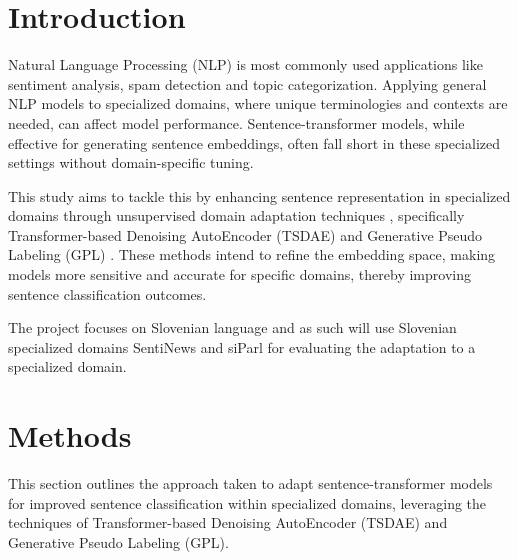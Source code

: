 \documentclass[fleqn,moreauthors,10pt]{ds_report}
\affiliation{\textit{Advisors: Boshko Koloski}}
\begin{document}
\flushbottom 

\maketitle 

\thispagestyle{empty} 


\section*{Introduction}

Natural Language Processing (NLP) is most commonly used applications like sentiment analysis, spam detection and topic categorization. 
Applying general NLP models to specialized domains, where unique terminologies and contexts are needed, can affect model performance. 
Sentence-transformer models, while effective for generating sentence embeddings, often fall short in these specialized settings without domain-specific tuning.

This study aims to tackle this by enhancing sentence representation in specialized domains through unsupervised domain adaptation techniques \cite{unsupervised-domain-adaptation, transfer-leraning-domain-adaptation, knowlage-distillation}, specifically Transformer-based Denoising AutoEncoder (TSDAE) \cite{tsdae} and Generative Pse\-udo Labeling (GPL) \cite{gpl}. 
These methods intend to refine the embedding space, making models more sensitive and accurate for specific domains, thereby improving sentence classification outcomes.

The project focuses on Slovenian language and as such will use Slovenian specialized domains SentiNews \cite{SentiNews} and siParl \cite{siParl} for evaluating the adaptation to a specialized domain.



\section*{Methods}

This section outlines the approach taken to adapt sentence-transformer models for improved sentence classification within specialized domains, leveraging the techniques of Transformer-based Denoising AutoEncoder (TSDAE) and Generative Pse\-udo Labeling (GPL).
\end{document}
